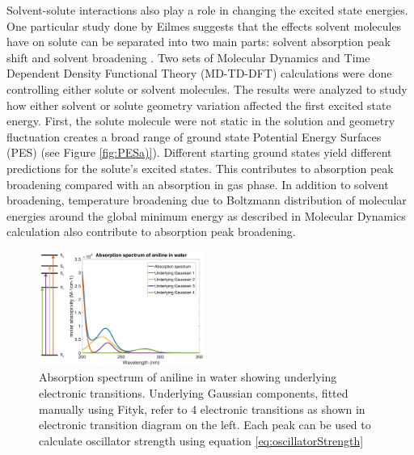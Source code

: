 \documentclass[
journal=jpcbfk, %
manuscript=article]{achemso}
\begin{document}
	Solvent-solute interactions also play a role in changing the excited state energies.\cite{Reichardt2011,Turro2010,Clemens2008,Suendo2012,Kakitani1987,Marcus1989,Matyushov2004,Barthel2001} One particular study done by Eilmes suggests that the effects solvent molecules have on solute can be separated into two main parts: solvent absorption peak shift and solvent broadening .\cite{Eilmes2014} Two sets of Molecular Dynamics and Time Dependent Density Functional Theory (MD-TD-DFT) calculations were done controlling either solute or solvent molecules. The results were analyzed to study how either solvent or solute geometry variation affected the first excited state energy. First, the solute molecule were not static in the solution and geometry fluctuation creates a broad range of ground state Potential Energy Surfaces (PES) (see Figure \ref{fig:PESa)}).  Different starting ground states yield different predictions for the solute's excited states. This contributes to absorption peak broadening compared with an absorption in gas phase. In addition to solvent broadening, temperature broadening due to Boltzmann distribution of molecular energies around the global minimum energy as described in Molecular Dynamics calculation also contribute to absorption peak broadening. 
		\begin{figure}
			\vspace{-15pt}
			\centering
			\includegraphics[width=0.48\textwidth]{images/quantum_to_bulk.pdf}
			\caption{Absorption spectrum of aniline in water showing underlying electronic transitions. Underlying Gaussian components, fitted manually using Fityk, refer to 4 electronic transitions as shown in electronic transition diagram on the left. Each peak can be used to calculate oscillator strength using equation \ref{eq:oscillatorStrength}}\label{fig:UVFromFityk}
			\vspace{-30pt}
		\end{figure}
		
\end{document}
